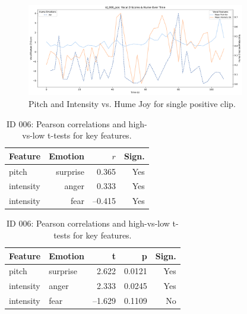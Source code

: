 \medskip

\begin{figure}[H]
    \centering
    
    \includegraphics[width=0.85\textwidth]{png/results/rq3_2/combined_zscore_hume_id_006_pos_4.pdf}
    \caption{Pitch and Intensity vs. Hume Joy for single positive clip.}
    \label{fig:006_pos-anger-joy}
\end{figure}
\begin{table}[H]
    \centering
    \begin{subtable}{0.45\textwidth}
      \centering
      \caption{Correlation (ID 006)}\label{tab:id006_corr}
      \begin{tabular}{l r r r}
        \toprule
        \textbf{Feature} & \textbf{Emotion} & \textbf{\(r\)} & \textbf{Sign.} \\
        \midrule
        pitch     & surprise &  0.365 & Yes \\
        intensity & anger    &  0.333 & Yes \\
        intensity & fear     & –0.415 & Yes \\
        \bottomrule
      \end{tabular}
    \end{subtable}\hfill
    \begin{subtable}{0.45\textwidth}
      \centering
      \caption{High vs Low T-Test (ID 006)}\label{tab:id006_ttest}
      \begin{tabular}{l l r r r}
        \toprule
        \textbf{Feature} & \textbf{Emotion} & \textbf{t} & \textbf{p} & \textbf{Sign.} \\
        \midrule
        pitch     & surprise &  2.622 & 0.0121 & Yes \\
        intensity & anger    &  2.333 & 0.0245 & Yes \\
        intensity & fear     & –1.629 & 0.1109 & No  \\
        \bottomrule
      \end{tabular}
    \end{subtable}
  
    \caption{ID 006: Pearson correlations and high-vs-low t-tests for key features.}
    \label{tab:id006_summary}
  \end{table}


